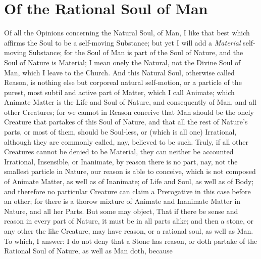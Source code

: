 
\author{Margaret Cavendish}
\chapter{Of the Rational Soul of Man}


Of all the Opinions concerning the Natural Soul, of Man, I
like that best which affirms the Soul to be a self-moving Substance;
but yet I will add a \textit{Material} self-moving Substance; for the
Soul of Man is part of the Soul of Nature, and the Soul of Nature is
Material; I mean onely the Natural, not the Divine Soul of Man, which
I leave to the Church. And this Natural Soul, otherwise called Reason,
is nothing else but corporeal natural self-motion, or a particle of
the purest, most subtil and active part of Matter, which I call
Animate; which Animate Matter is the Life and Soul of Nature, and
consequently of Man, and all other Creatures; for we cannot in
Reason conceive that Man should be the onely Creature that partakes of
this Soul of Nature, and that all the rest of Nature's parts, or most
of them, should be Soul-less, or (which is all one) Irrational,
although they are commonly called, nay, believed to be such. Truly, if
all other Creatures cannot be denied to be Material, they can neither
be accounted Irrational, Insensible, or Inanimate, by reason there is
no part, nay, not the smallest particle in Nature, our reason
 is able to conceive, which is not composed of Animate
Matter, as well as of Inanimate; of Life and Soul, as well as of Body;
and therefore no particular Creature can claim a Prerogative in this
case before an other; for there is a thorow mixture of Animate and
Inanimate Matter in Nature, and all her Parts. But some may object,
That if there be sense and reason in every part of Nature, it must
be in all parts alike; and then a stone, or any other the like
Creature, may have reason, or a rational soul, as well as Man. To
which, I answer: I do not deny that a Stone has reason, or doth
partake of the Rational Soul of Nature, as well as Man doth, because
